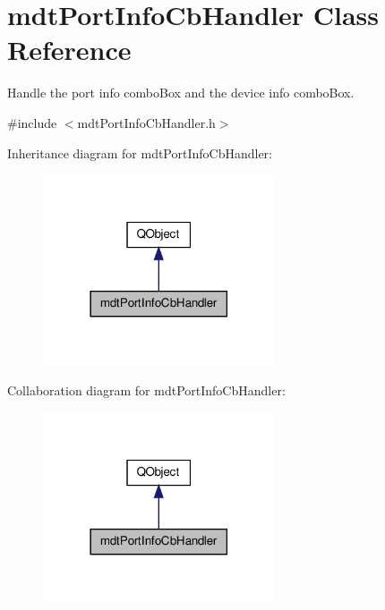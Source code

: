 \hypertarget{classmdt_port_info_cb_handler}{\section{mdt\-Port\-Info\-Cb\-Handler Class Reference}
\label{classmdt_port_info_cb_handler}
}


Handle the port info combo\-Box and the device info combo\-Box.  




{\ttfamily \#include $<$mdt\-Port\-Info\-Cb\-Handler.\-h$>$}



Inheritance diagram for mdt\-Port\-Info\-Cb\-Handler\-:
\nopagebreak
\begin{figure}[H]
\begin{center}
\leavevmode
\includegraphics[width=194pt]{classmdt_port_info_cb_handler__inherit__graph}
\end{center}
\end{figure}


Collaboration diagram for mdt\-Port\-Info\-Cb\-Handler\-:
\nopagebreak
\begin{figure}[H]
\begin{center}
\leavevmode
\includegraphics[width=194pt]{classmdt_port_info_cb_handler__coll__graph}
\end{center}
\end{figure}
